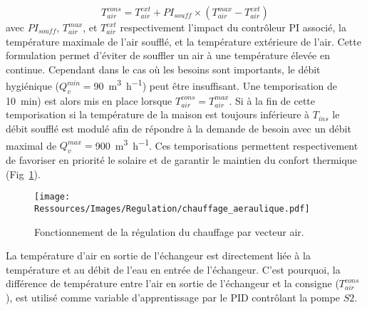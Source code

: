\begin{equation}\label{eq:temp_soufflage}
    T_{air}^{cons} = T_{air}^{ext} + PI_{souff} \times (T_{air}^{max} - T_{air}^{ext})
\end{equation}
avec $PI_{souff}$, $T_{air}^{max}$, et $T_{air}^{ext}$ respectivement l’impact du
contrôleur PI associé, la température maximale de l’air soufflé, et la température
extérieure de l’air. Cette formulation permet d’éviter de souffler un air à une
température élevée en continue. Cependant dans le cas où les besoins sont importants, le
débit hygiénique ($Q_{v}^{min} = $\SI[per-mode=symbol]{90}{\meter\cubed\per\hour}) peut être insuffisant. Une
temporisation de \SI{10}{min}) est alors mis en place lorsque $T_{air}^{cons} =
T_{air}^{max}$. Si à la fin de cette temporisation si la température de la maison est
toujours inférieure à $T_{ins}$ le débit soufflé est modulé afin de répondre à la demande
de besoin avec un débit maximal de $Q_{v}^{max} = $\SI[per-mode=symbol]{900}{\meter\cubed\per\hour}. Ces
temporisations permettent respectivement de favoriser en priorité le solaire et de
garantir le maintien du confort thermique (Fig~\ref{fig:chauffage_aeraulique}).

\begin{figure}
    \begin{center}
        \texttt{[image: Ressources/Images/Regulation/chauffage\_aeraulique.pdf]}
    \end{center}
    \caption{Fonctionnement de la régulation du chauffage par vecteur air.
             \label{fig:chauffage_aeraulique}}
\end{figure}

La température d’air en sortie de l’échangeur est directement liée à la température et au
débit de l’eau en entrée de l’échangeur. C’est pourquoi, la différence de température
entre l’air en sortie de l’échangeur et la consigne ($T_{air}^{cons}$), est utilisé comme
variable d’apprentissage par le PID contrôlant la pompe $S2$.



